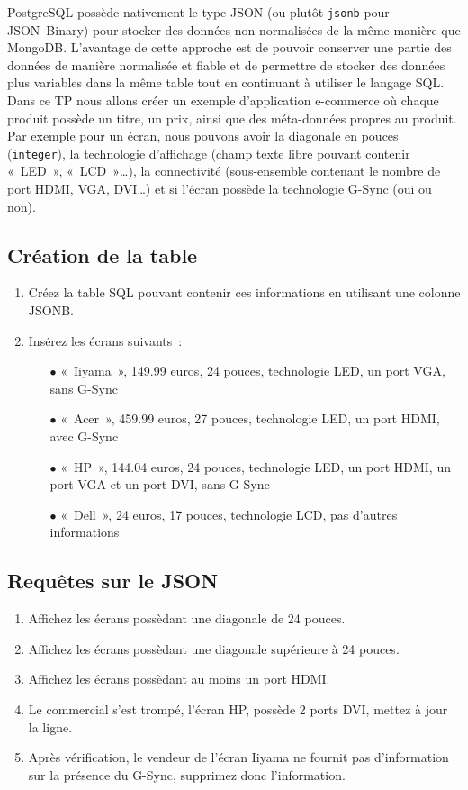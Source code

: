 \documentclass[a4paper,10pt]{article}
\begin{document}
  PostgreSQL possède nativement le type JSON (ou plutôt \texttt{jsonb} pour JSON Binary) pour stocker des données non normalisées de la même manière que MongoDB. L'avantage de cette approche est de pouvoir conserver une partie des données de manière normalisée et fiable et de permettre de stocker des données plus variables dans la même table tout en continuant à utiliser le langage SQL.\\

  Dans ce TP nous allons créer un exemple d'application e-commerce où chaque produit possède un titre, un prix, ainsi que des méta-données propres au produit. Par exemple pour un écran, nous pouvons avoir la diagonale en pouces (\texttt{integer}), la technologie d'affichage (champ texte libre pouvant contenir « LED », « LCD »…), la connectivité (sous-ensemble contenant le nombre de port HDMI, VGA, DVI…) et si l'écran possède la technologie G-Sync (oui ou non).\\

  \subsection{Création de la table}
    \begin{enumerate}
      \item Créez la table SQL pouvant contenir ces informations en utilisant une colonne JSONB.
      \item Insérez les écrans suivants :
          \begin{itemize}
          \item[$\bullet$] « Iiyama », 149.99 euros, 24 pouces, technologie LED, un port VGA, sans G-Sync
          \item[$\bullet$] « Acer », 459.99 euros, 27 pouces, technologie LED, un port HDMI, avec G-Sync
          \item[$\bullet$] « HP », 144.04 euros, 24 pouces, technologie LED, un port HDMI, un port VGA et un port DVI, sans G-Sync
          \item[$\bullet$] « Dell », 24 euros, 17 pouces,  technologie LCD, pas d'autres informations
         \end{itemize}
    \end{enumerate}

  \subsection{Requêtes sur le JSON}
    \begin{enumerate}
      \item Affichez les écrans possèdant une diagonale de 24 pouces.
      \item Affichez les écrans possèdant une diagonale supérieure à 24 pouces.
      \item Affichez les écrans possèdant au moins un port HDMI.
      \item Le commercial s'est trompé, l'écran HP, possède 2 ports DVI, mettez à jour la ligne.
      \item Après vérification, le vendeur de l'écran Iiyama ne fournit pas d'information sur la présence du G-Sync, supprimez donc l'information.
    \end{enumerate}
\end{document}
